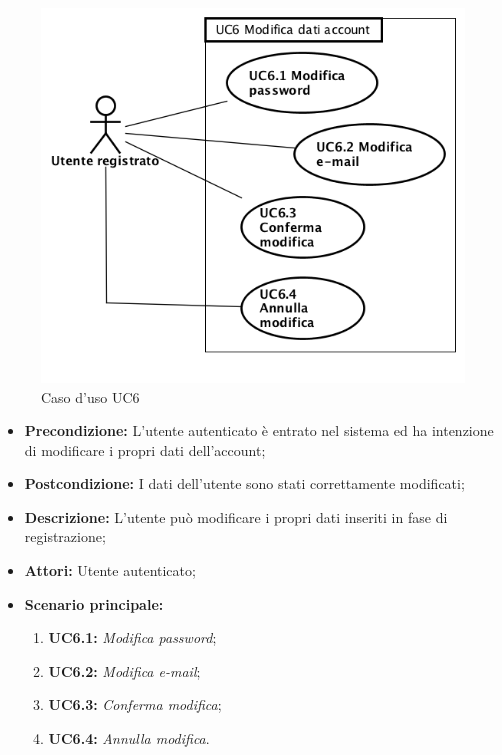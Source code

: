 \begin{figure}[h]
	\begin{center}
	\includegraphics[scale=0.4]{diagram/UC6.png}
	\caption{Caso d'uso UC6}
	\end{center}
\end{figure}
\begin{itemize}
	\item \textbf{Precondizione:} L’utente autenticato è entrato nel sistema ed ha intenzione di modificare i propri dati dell’account;
	\item \textbf{Postcondizione:} I dati dell’utente sono stati correttamente modificati;
	\item \textbf{Descrizione:} L’utente può modificare i propri dati inseriti in fase di registrazione;
	\item \textbf{Attori:} Utente autenticato;
	\item \textbf{Scenario principale:}
	\begin{enumerate}
		\item \textbf{ UC6.1:} \textit{ Modifica password};
		\item \textbf{ UC6.2:} \textit{ Modifica e-mail};
		\item \textbf{ UC6.3:} \textit{ Conferma modifica};
		\item \textbf{ UC6.4:} \textit{ Annulla modifica}.
	\end{enumerate}
\end{itemize}


